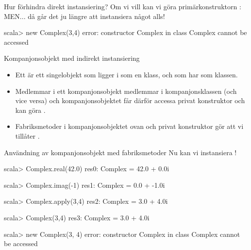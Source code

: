 \begin{Slide}{Hur förhindra direkt instansiering?}
Om vi vill  kan vi göra primärkonstruktorn :
MEN... då går det ju  längre att instansiera något alls!  \code{   :(}
\begin{REPLnonum}
scala> new Complex(3,4)
error:
 constructor Complex in class Complex cannot be accessed
\end{REPLnonum}
\end{Slide}



\begin{Slide}{Kompanjonsobjekt med indirekt instansiering}\SlideFontSmall
\setlength{\leftmargini}{0pt}
\begin{itemize}
\item Ett   är ett singelobjekt som ligger i  som en klass, och som har  som klassen.

\item Medlemmar i ett kompanjonsobjekt  medlemmar i kompanjonsklassen (och vice versa) och kompanjonsobjektet får därför accessa privat konstruktor och kan göra .

\item Fabriksmetoder i kompanjonsobjektet ovan och privat konstruktor gör att vi  tillåter .
\end{itemize}
\end{Slide}

\begin{Slide}{Användning av kompanjonsobjekt med fabriksmetoder}
Nu kan vi  instansiera !  \code{   :)}
\begin{REPLnonum}
scala> Complex.real(42.0)
res0: Complex = 42.0 + 0.0i

scala> Complex.imag(-1)
res1: Complex = 0.0 + -1.0i

scala> Complex.apply(3,4)
res2: Complex = 3.0 + 4.0i

scala> Complex(3,4)
res3: Complex = 3.0 + 4.0i

scala> new Complex(3, 4)
error:
     constructor Complex in class Complex cannot be accessed
\end{REPLnonum}
\end{Slide}


